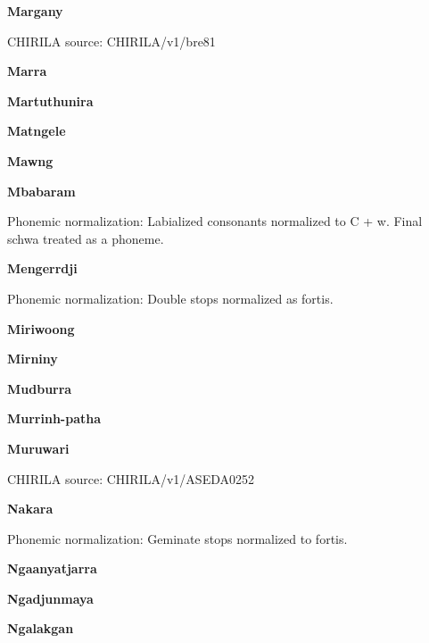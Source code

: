 
\textbf{Margany}

CHIRILA source: CHIRILA/v1/bre81


\textbf{Marra}


\textbf{Martuthunira}


\textbf{Matngele}


\textbf{Mawng}


\textbf{Mbabaram}


Phonemic normalization: Labialized consonants normalized to C + w. Final
schwa treated as a phoneme.

\textbf{Mengerrdji}


Phonemic normalization: Double stops normalized as fortis.

\textbf{Miriwoong}


\textbf{Mirniny}


\textbf{Mudburra}


\textbf{Murrinh-patha}


\textbf{Muruwari}

CHIRILA source: CHIRILA/v1/ASEDA0252


\textbf{Nakara}


Phonemic normalization: Geminate stops normalized to fortis.

\textbf{Ngaanyatjarra}


\textbf{Ngadjunmaya}


\textbf{Ngalakgan}

